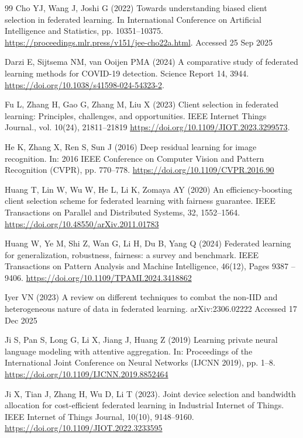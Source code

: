 \documentclass[pdflatex,sn-mathphys-num,oneside]{sn-jnl}%
\theoremstyle{thmstyleone}%
\theoremstyle{thmstyletwo}%
\theoremstyle{thmstylethree}%
\begin{document}
\begin{thebibliography}{99}
Cho YJ, Wang J, Joshi G (2022) Towards understanding biased client selection in federated learning. In International Conference on Artificial Intelligence and Statistics, pp. 10351–10375. \url{https://proceedings.mlr.press/v151/jee-cho22a.html}. Accessed 25 Sep 2025

Darzi E, Sijtsema NM, van Ooijen PMA (2024) A comparative study of federated learning methods for COVID-19 detection. Science Report 14, 3944. \url{https://doi.org/10.1038/s41598-024-54323-2}.

Fu L, Zhang H, Gao G, Zhang M, Liu X (2023) Client selection in federated learning: Principles, challenges, and opportunities. IEEE Internet Things Journal., vol. 10(24), 21811–21819 \url{https://doi.org/10.1109/JIOT.2023.3299573}.



He K, Zhang X, Ren S, Sun J (2016) Deep residual learning for image recognition. In: 2016 IEEE Conference on Computer Vision and Pattern Recognition (CVPR), pp. 770–778. \url{https://doi.org/10.1109/CVPR.2016.90}

Huang T, Lin W, Wu W, He L, Li K, Zomaya AY (2020) An efficiency-boosting client selection scheme for federated learning with fairness guarantee. IEEE Transactions on Parallel and Distributed Systems, 32, 1552–1564. \url{https://doi.org/10.48550/arXiv.2011.01783}

Huang W, Ye M, Shi Z, Wan G, Li H, Du B, Yang Q (2024) Federated learning for generalization, robustness, fairness: a survey and benchmark. IEEE Transactions on Pattern Analysis and Machine Intelligence, 46(12), Pages 9387 – 9406. \url{https://doi.org/10.1109/TPAMI.2024.3418862}

Iyer VN (2023) A review on different techniques to combat the non-IID and heterogeneous nature of data in federated learning. arXiv:2306.02222 Accessed 17 Dec 2025

Ji S, Pan S, Long G, Li X, Jiang J, Huang Z (2019) Learning private neural language modeling with attentive aggregation. In: Proceedings of the International Joint Conference on Neural Networks (IJCNN 2019), pp. 1–8. \url{https://doi.org/10.1109/IJCNN.2019.8852464}

Ji X, Tian J, Zhang H, Wu D, Li T (2023). Joint device selection and bandwidth allocation for cost-efficient federated learning in Industrial Internet of Things. IEEE Internet of Things Journal, 10(10), 9148–9160. \url{https://doi.org/10.1109/JIOT.2022.3233595}


\end{thebibliography}
\end{document}
